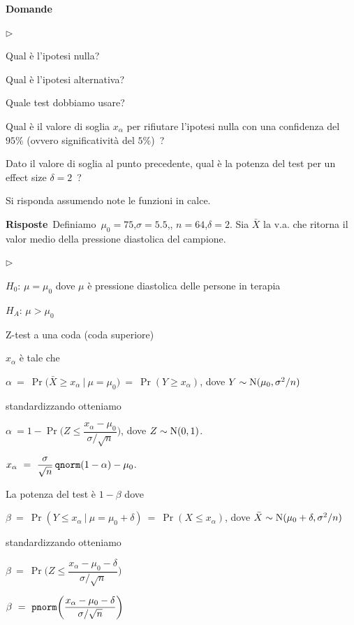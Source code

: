 \documentclass[11pt,openany]{book}
\newcommand{\mylabel}[1]{{\footnotesize\textsf{#1}}\hfill}
\renewenvironment{itemize}
  {\begin{list}{$\triangleright$}{%
   \setlength{\parskip}{0mm}
   \setlength{\topsep}{.2\baselineskip}
   \setlength{\rightmargin}{0mm}
   \setlength{\listparindent}{0mm}
   \setlength{\itemindent}{0mm}
   \setlength{\labelwidth}{3ex}
   \setlength{\itemsep}{.4\baselineskip}
   \setlength{\parsep}{0mm}
   \setlength{\partopsep}{0mm}
   \setlength{\labelsep}{1ex}
   \setlength{\leftmargin}{\labelwidth+\labelsep}
   \let\makelabel\mylabel}}{%
   \end{list}\vspace*{-1.3mm}}
\begin{document}
\textbf{Domande}

\begin{itemize}
\item[1.] Qual è l'ipotesi nulla?
\item[2.] Qual è l'ipotesi alternativa?
\item[3.] Quale test dobbiamo usare?
\item[4.] Qual è il valore di soglia $x_\alpha$ per rifiutare l'ipotesi nulla con una confidenza del $95\%$ (ovvero significatività del $5\%$)~?
\item[5.] Dato il valore di soglia al punto precedente, qual è la potenza del test per un effect size $\delta=2$~? 
\end{itemize}
Si risponda assumendo note le funzioni in calce.

\textbf{Risposte}\  Definiamo\ $\mu_0=75$,\quad $\sigma=5.5$,\quad, $n=64$,\quad $\delta=2$. Sia $\bar X$ la v.a. che ritorna il valor medio della pressione diastolica del campione.

\begin{itemize}
\item[1.] $H_0$: $\mu=\mu_0$ dove $\mu$ è pressione diastolica delle persone in terapia 
\item[2.] $H_A$: $\mu>\mu_0$
\item[3.] Z-test a una coda (coda superiore)
\item[4.] $x_\alpha$ è tale che \medskip

$\alpha\ =\ \Pr\big(\bar X\ge x_\alpha\ \mathbin\big|\ \mu=\mu_0\big)\ =\ \Pr(Y\ge x_\alpha)$, dove $Y\sim {\rm N}(\mu_0,\sigma^2/n)$ \medskip

standardizzando otteniamo \medskip

$\alpha\ =1-\Pr\bigg(Z\le \dfrac{x_\alpha-\mu_0}{\sigma/\sqrt n}\bigg)$, dove $Z\sim {\rm N}(0,1)$.

\hfill $x_\alpha\ =\ \dfrac{\sigma}{\sqrt n}\,{\tt qnorm}(1-\alpha)-\mu_0$.

\item[5.] La potenza del test è $1-\beta$ dove\medskip

$\beta\ =\ \Pr(Y\le x_\alpha\ |\ \mu=\mu_0+\delta)\ =\ \Pr(X\le x_\alpha)$, dove $\bar X\sim {\rm N}(\mu_0+\delta,\sigma^2/n)$\medskip

standardizzando otteniamo \medskip

$\beta\ =\ \Pr\bigg(Z\le  \dfrac{x_\alpha-\mu_0-\delta}{\sigma/\sqrt n}\bigg)$

\hfill$\beta\ =\  {\tt pnorm}\bigg(\dfrac{x_\alpha-\mu_0-\delta}{\sigma/\sqrt n}\bigg)$

\end{itemize}
\end{document}
